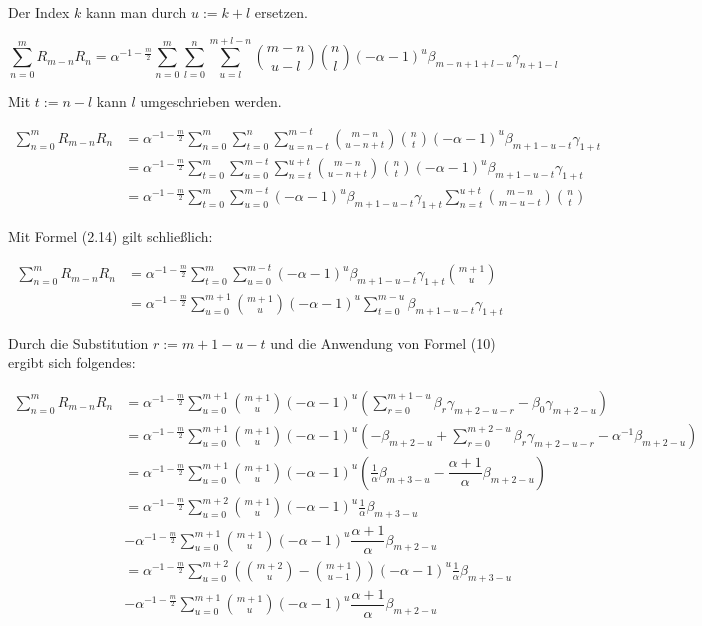 \documentclass[a4paper, 11pt]{scrreprt}
\begin{document}
Der Index $k$ kann man durch $u:=k+l$ ersetzen.

\[\sum_{n=0}^m R_{m-n} R_n = \alpha^{-1-\frac{m}{2}} \sum_{n=0}^m \sum_{l=0}^n \sum_{u=l}^{m+l-n} \binom{m-n}{u-l}  \binom{n}{l} (-\alpha -1)^u \beta_{m-n+1+l-u} \gamma_{n+1-l}\]

Mit $t:=n-l$ kann $l$ umgeschrieben werden.

\begin{align*}
\sum_{n=0}^m R_{m-n} R_n 
&= \alpha^{-1-\frac{m}{2}} \sum_{n=0}^m \sum_{t=0}^n \sum_{u=n-t}^{m-t} \binom{m-n}{u-n+t}  \binom{n}{t} (-\alpha -1)^u \beta_{m+1-u-t} \gamma_{1+t} \\
&= \alpha^{-1-\frac{m}{2}} \sum_{t=0}^m \sum_{u=0}^{m-t} \sum_{n=t}^{u+t} \binom{m-n}{u-n+t}  \binom{n}{t} (-\alpha -1)^u \beta_{m+1-u-t} \gamma_{1+t} \\
&= \alpha^{-1-\frac{m}{2}} \sum_{t=0}^{m} \sum_{u=0}^{m-t} (-\alpha -1)^u \beta_{m+1-u-t} \gamma_{1+t} \sum_{n=t}^{u+t} \binom{m-n}{m-u-t}  \binom{n}{t}
\end{align*}

Mit Formel (2.14) gilt schließlich:

\begin{align*}
\sum_{n=0}^m R_{m-n} R_n 
&= \alpha^{-1-\frac{m}{2}} \sum_{t=0}^m \sum_{u=0}^{m-t} (-\alpha -1)^u \beta_{m+1-u-t} \gamma_{1+t} \binom{m+1}{u} \\
&= \alpha^{-1-\frac{m}{2}} \sum_{u=0}^{m+1} \binom{m+1}{u} (-\alpha -1)^u \sum_{t=0}^{m-u} \beta_{m+1-u-t} \gamma_{1+t}
\end{align*}

Durch die Substitution $r := m+1-u-t$ und die Anwendung von Formel (10) ergibt sich folgendes:

\begin{align*}
\sum_{n=0}^m R_{m-n} R_n
&= \alpha^{-1-\frac{m}{2}} \sum_{u=0}^{m+1} \binom{m+1}{u} (-\alpha -1)^u \left( \sum_{r=0}^{m+1-u} \beta_r \gamma_{m+2-u-r} - \beta_0 \gamma_{m+2-u} \right) \\
&= \alpha^{-1-\frac{m}{2}} \sum_{u=0}^{m+1} \binom{m+1}{u} (-\alpha -1)^u \left( - \beta_{m+2-u} + \sum_{r=0}^{m+2-u} \beta_r \gamma_{m+2-u-r} - \alpha^{-1} \beta_{m+2-u}\right) \\
&= \alpha^{-1-\frac{m}{2}} \sum_{u=0}^{m+1} \binom{m+1}{u} (-\alpha -1)^u \left(\frac{1}{\alpha} \beta_{m+3-u} - \dfrac{\alpha +1}{\alpha}\beta_{m+2-u} \right) \\
&= \alpha^{-1-\frac{m}{2}} \sum_{u=0}^{m+2} \binom{m+1}{u} (-\alpha -1)^u \frac{1}{\alpha} \beta_{m+3-u} \\
&- \alpha^{-1-\frac{m}{2}} \sum_{u=0}^{m+1} \binom{m+1}{u} (-\alpha -1)^u \dfrac{\alpha +1}{\alpha}\beta_{m+2-u} \\
&= \alpha^{-1-\frac{m}{2}} \sum_{u=0}^{m+2} \left( \binom{m+2}{u} -\binom{m+1}{u-1} \right) (-\alpha -1)^u \frac{1}{\alpha} \beta_{m+3-u} \\
&- \alpha^{-1-\frac{m}{2}} \sum_{u=0}^{m+1} \binom{m+1}{u} (-\alpha -1)^u \dfrac{\alpha +1}{\alpha}\beta_{m+2-u} \\
\end{align*}
\end{document}
